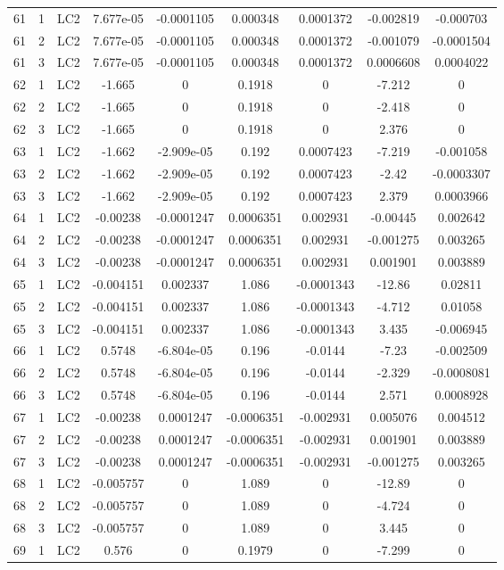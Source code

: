 \documentclass{article}%
\begin{document}
\begin{longtable}{| c c c | c c c c c c |}
61&1&LC2&7.677e{-}05&{-}0.0001105&0.000348&0.0001372&{-}0.002819&{-}0.000703\\%
61&2&LC2&7.677e{-}05&{-}0.0001105&0.000348&0.0001372&{-}0.001079&{-}0.0001504\\%
61&3&LC2&7.677e{-}05&{-}0.0001105&0.000348&0.0001372&0.0006608&0.0004022\\%
62&1&LC2&{-}1.665&0&0.1918&0&{-}7.212&0\\%
62&2&LC2&{-}1.665&0&0.1918&0&{-}2.418&0\\%
62&3&LC2&{-}1.665&0&0.1918&0&2.376&0\\%
63&1&LC2&{-}1.662&{-}2.909e{-}05&0.192&0.0007423&{-}7.219&{-}0.001058\\%
63&2&LC2&{-}1.662&{-}2.909e{-}05&0.192&0.0007423&{-}2.42&{-}0.0003307\\%
63&3&LC2&{-}1.662&{-}2.909e{-}05&0.192&0.0007423&2.379&0.0003966\\%
64&1&LC2&{-}0.00238&{-}0.0001247&0.0006351&0.002931&{-}0.00445&0.002642\\%
64&2&LC2&{-}0.00238&{-}0.0001247&0.0006351&0.002931&{-}0.001275&0.003265\\%
64&3&LC2&{-}0.00238&{-}0.0001247&0.0006351&0.002931&0.001901&0.003889\\%
65&1&LC2&{-}0.004151&0.002337&1.086&{-}0.0001343&{-}12.86&0.02811\\%
65&2&LC2&{-}0.004151&0.002337&1.086&{-}0.0001343&{-}4.712&0.01058\\%
65&3&LC2&{-}0.004151&0.002337&1.086&{-}0.0001343&3.435&{-}0.006945\\%
66&1&LC2&0.5748&{-}6.804e{-}05&0.196&{-}0.0144&{-}7.23&{-}0.002509\\%
66&2&LC2&0.5748&{-}6.804e{-}05&0.196&{-}0.0144&{-}2.329&{-}0.0008081\\%
66&3&LC2&0.5748&{-}6.804e{-}05&0.196&{-}0.0144&2.571&0.0008928\\%
67&1&LC2&{-}0.00238&0.0001247&{-}0.0006351&{-}0.002931&0.005076&0.004512\\%
67&2&LC2&{-}0.00238&0.0001247&{-}0.0006351&{-}0.002931&0.001901&0.003889\\%
67&3&LC2&{-}0.00238&0.0001247&{-}0.0006351&{-}0.002931&{-}0.001275&0.003265\\%
68&1&LC2&{-}0.005757&0&1.089&0&{-}12.89&0\\%
68&2&LC2&{-}0.005757&0&1.089&0&{-}4.724&0\\%
68&3&LC2&{-}0.005757&0&1.089&0&3.445&0\\%
69&1&LC2&0.576&0&0.1979&0&{-}7.299&0\\%

\end{longtable}
\end{document}

